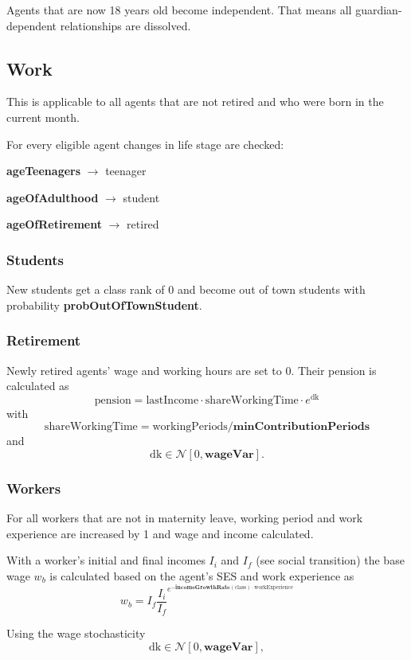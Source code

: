\documentclass{article}
\begin{document}
Agents that are now 18 years old become independent. That means all guardian-dependent relationships are dissolved.

\subsection{Work}

This is applicable to all agents that are not retired and who were born in the current month.

For every eligible agent changes in life
stage are checked: 

\textbf{ageTeenagers} $\rightarrow$ teenager

\textbf{ageOfAdulthood} $\rightarrow$ student

\textbf{ageOfRetirement} $\rightarrow$ retired 

\subsubsection*{Students}

New students get a class rank of 0 and become out of town students with probability \textbf{probOutOfTownStudent}. 

\subsubsection*{Retirement}

Newly retired agents' wage and working hours are set to 0. Their pension is calculated as 
\[
\mathrm{pension} = \mathrm{lastIncome} \cdot \mathrm{shareWorkingTime} \cdot e^\mathrm{dk}
\]
with
\[
\mathrm{shareWorkingTime} = \mathrm{workingPeriods} / \mathbf{minContributionPeriods}
\]
and
\[
\mathrm{dk} \in \mathcal{N}[0, \mathbf{wageVar}].
\]

\subsubsection*{Workers}

For all workers that are not in maternity leave, working period and work experience are increased by 1 and wage and income calculated.

With a worker's initial and final incomes $I_i$ and $I_f$ (see social transition) the base wage $w_b$ is calculated based on the agent's SES and work experience as
\[
w_b = I_f \frac{I_i}{I_f}^{e^{-\mathbf{incomeGrowthRate}(\mathrm{class})\cdot \mathrm{workExperience}}}
\]

Using the wage stochasticity
\[
\mathrm{dk} \in \mathcal{N}[0, \mathbf{wageVar}],
\]
\end{document}
